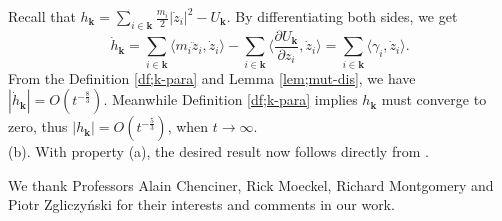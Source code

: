 \documentclass[11pt]{amsart}
\theoremstyle{definition}
\theoremstyle{remark}
\numberwithin{equation}{section}
\newcommand{\bk}{\mathbf k}
\begin{document}
Recall that $h_\mathbf{k}=\underset{i\in\mathbf{k}}{\sum}\frac{m_i}{2}|\dot{z}_i|^2 -U_{\bk}$. By differentiating both sides, we get   
$$ \dot{h}_{\bk} =\sum_{i \in \bk} \langle m_i\ddot{z}_i,\dot{z}_i\rangle-\sum_{i \in \bk}\langle \frac{\partial U_{\bk}}{\partial z_i},\dot{z}_i\rangle =\sum_{i \in \bk} \langle \gamma_i,\dot{z}_i\rangle.$$
From the Definition \ref{df;k-para} and Lemma \ref{lem;mut-dis}, we have $|\dot{h}_\bk|=O(t^{-\frac{8}{3}})$. Meanwhile Definition \ref{df;k-para} implies $h_\bk$ must converge to zero, thus $|h_\bk|=O(t^{-\frac{5}{3}})$, when $t \to \infty$.\\
\indent (b). With property (a), the desired result now follows directly from \cite[Corollary 4]{MS76}.


\hfill\newline
{}  We thank Professors Alain Chenciner, Rick Moeckel, Richard Montgomery and Piotr Zgliczy\'nski for their interests and comments in our work. 


%

\end{document}
